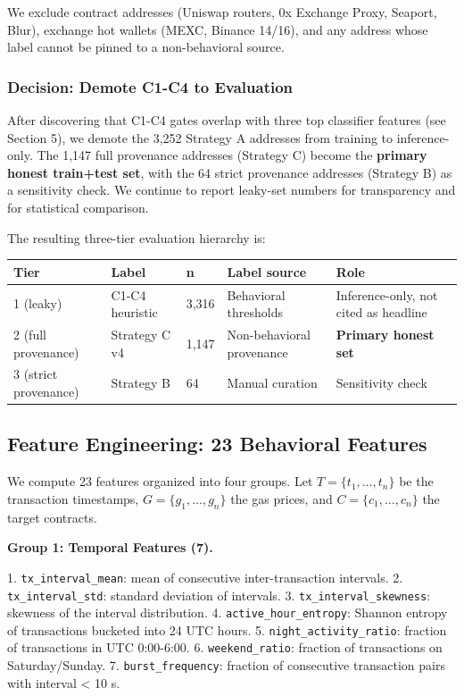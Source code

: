 \documentclass[sigconf,nonacm=false]{acmart}
\begin{document}
We exclude contract addresses (Uniswap routers, 0x Exchange Proxy, Seaport, Blur), exchange hot wallets (MEXC, Binance 14/16), and any address whose label cannot be pinned to a non-behavioral source.

\subsubsection{Decision: Demote C1-C4 to Evaluation}

After discovering that C1-C4 gates overlap with three top classifier features (see Section 5), we demote the 3,252 Strategy A addresses from training to inference-only. The 1,147 full provenance addresses (Strategy C) become the \textbf{primary honest train+test set}, with the 64 strict provenance addresses (Strategy B) as a sensitivity check. We continue to report leaky-set numbers for transparency and for statistical comparison.

The resulting three-tier evaluation hierarchy is:

\begin{table}[h]
\centering
\small
\begin{tabular}{lllll}
\toprule
Tier & Label & n & Label source & Role \\
\midrule
1 (leaky) & C1-C4 heuristic & 3,316 & Behavioral thresholds & Inference-only, not cited as headline \\
2 (full provenance) & Strategy C v4 & 1,147 & Non-behavioral provenance & \textbf{Primary honest set} \\
3 (strict provenance) & Strategy B & 64 & Manual curation & Sensitivity check \\
\bottomrule
\end{tabular}
\end{table}

\subsection{Feature Engineering: 23 Behavioral Features}

We compute 23 features organized into four groups. Let $T = \{t_1, \ldots, t_n\}$ be the transaction timestamps, $G = \{g_1, \ldots, g_n\}$ the gas prices, and $C = \{c_1, \ldots, c_n\}$ the target contracts.

\textbf{Group 1: Temporal Features (7).}

1. \texttt{tx\_interval\_mean}: mean of consecutive inter-transaction intervals.
2. \texttt{tx\_interval\_std}: standard deviation of intervals.
3. \texttt{tx\_interval\_skewness}: skewness of the interval distribution.
4. \texttt{active\_hour\_entropy}: Shannon entropy of transactions bucketed into 24 UTC hours.
5. \texttt{night\_activity\_ratio}: fraction of transactions in UTC 0:00-6:00.
6. \texttt{weekend\_ratio}: fraction of transactions on Saturday/Sunday.
7. \texttt{burst\_frequency}: fraction of consecutive transaction pairs with interval < 10 s.
\end{document}
